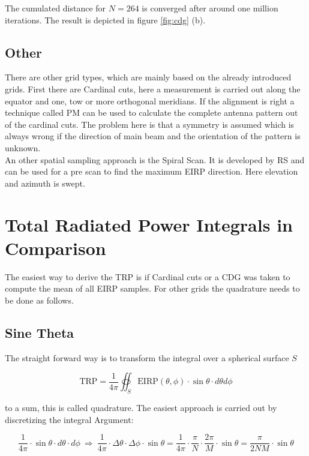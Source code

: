 The cumulated distance for $N = 264$ is converged after around one million iterations. The result is depicted in figure \ref{fig:cdg} (b).

\subsection{Other}

There are other grid types, which are mainly based on the already introduced grids. First there are Cardinal cuts, here a measurement is carried out along the equator and one, tow or more orthogonal meridians. If the alignment is right a technique called \acf{PM} can be used to calculate the complete antenna pattern out of the cardinal cuts. The problem here is that a symmetry is assumed which is always wrong if the direction of main beam and the orientation of the pattern is unknown. \cite{2018arXiv180310993F}\\
An other spatial sampling approach is the Spiral Scan. It is developed by \ac{RS} and can be used for a pre scan to find the maximum \ac{EIRP} direction. Here elevation and azimuth is swept. \cite{ctiaat}

\section{Total Radiated Power Integrals in Comparison}

The easiest way to derive the \ac{TRP} is if Cardinal cuts or a \ac{CDG} was taken to compute the mean of all \ac{EIRP} samples. For other grids the quadrature needs to be done as follows. \cite{trp}

\subsection{Sine Theta}

The straight forward way is to transform the integral over a spherical surface $S$

\begin{equation}
\text{TRP} = \frac{1}{4\pi}  \oiint_S \text{EIRP}\left(\theta,\phi\right)\cdot\sin\theta\cdot d\theta d\phi
\end{equation}

to a sum, this is called quadrature. The easiest approach is carried out by discretizing the integral Argument:  \cite{ctiaat}

\begin{equation}
\frac{1}{4\pi}\cdot\sin\theta\cdot d\theta\cdot d\phi \ \Rightarrow\ \frac{1}{4\pi}\cdot \Delta\theta\cdot \Delta\phi\cdot\sin\theta = \frac{1}{4\pi}\cdot \frac{\pi}{N}\cdot \frac{2\pi}{M}\cdot\sin\theta=\frac{\pi}{2NM}\cdot\sin\theta
\end{equation}

